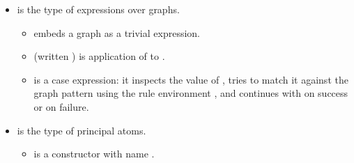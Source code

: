 \begin{isabellebody}
\begin{isamarkuptext}
\begin{itemize}
%
\begin{itemize}%
\item {} is the empty graph.

\item {} is an atomic cell with principal atom  and a list
 of incident links.

\item {} represents a fusion (equality) constraint between links
 and .

\item {} is the parallel composition (multiset union) of graphs
 and .

\item {} introduces a fresh link scope around .  The binder
 binds link index  in ; all other free link
indices in  are shifted accordingly.%
\end{itemize}

\item {} is the type of expressions over graphs.

%
\begin{itemize}%
\item {} embeds a graph  as a trivial expression.

\item {} (written ) is application of  to .

\item {} is a case expression:
it inspects the value of , tries to match it against the
graph pattern  using the rule environment \isa{{\isasymGamma}}, and
continues with  on success or  on failure.%
\end{itemize}

\item {} is the type of principal atoms.

%
\begin{itemize}%
\item {} is a constructor with name .


\end{itemize}
\end{itemize}
\end{isamarkuptext}
\end{isabellebody}
